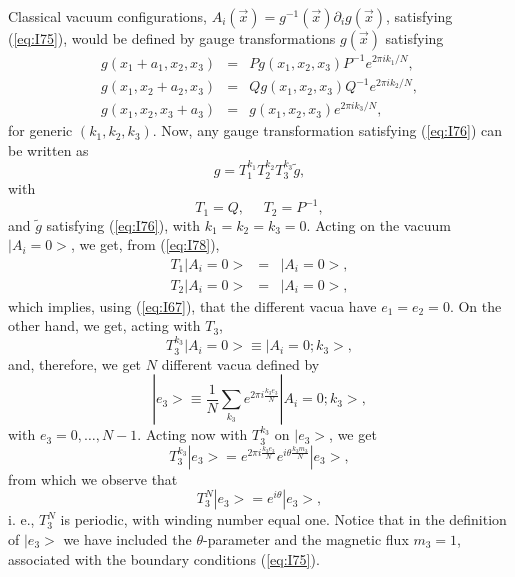 Classical vacuum configurations, $A_i(\vec{x}) = g^{-1}(\vec{x})
\partial_i g(\vec{x})$, satisfying (\ref{eq:I75}), would be
defined by gauge transformations $g(\vec{x})$ satisfying
\begin{eqnarray}
g(x_1+a_1,x_2,x_3) & = & P g(x_1,x_2,x_3) P^{-1} e^{2 \pi i k_1/N}, \nonumber \\
g(x_1,x_2+a_2,x_3) & = & Q g(x_1,x_2,x_3) Q^{-1} e^{2 \pi i k_2/N}, \nonumber \\
g(x_1,x_2,x_3+a_3) & = & g(x_1,x_2,x_3) e^{2 \pi i k_3/N},
\label{eq:I76}
\end{eqnarray}
for generic $(k_1,k_2,k_3)$. Now, any gauge transformation
satisfying (\ref{eq:I76}) can be written as
\begin{equation}
g=T_1^{k_1} T_2^{k_2} T_3^{k_3} \tilde{g},
\label{eq:I77}
\end{equation}
with
\begin{equation}
T_1 = Q, \: \: \: \: \: \: T_2 = P^{-1},
\label{eq:I78}
\end{equation}
and $\tilde{g}$ satisfying (\ref{eq:I76}), with $k_1=k_2=k_3=0$.
Acting on the vacuum $|A_i=0>$, we get, from (\ref{eq:I78}),
\begin{eqnarray}
T_1 |A_i =0> & = & |A_i=0>, \nonumber \\
T_2 |A_i =0> & = & |A_i=0>, 
\label{eq:I79}
\end{eqnarray}
which implies, using (\ref{eq:I67}), that the different vacua
have $e_1=e_2=0$. On the other hand, we get, acting with $T_3$, 
\begin{equation}
T_3^{k_3} |A_i=0> \equiv |A_i=0; k_3>,
\label{eq:I80}
\end{equation}
and, therefore, we get $N$ different vacua defined by 
\begin{equation}
|e_3> \equiv \frac {1}{N} \sum_{k_3} e^{2 \pi i \frac {k_3
e_3}{N}} |A_i=0 ; k_3>,
\label{eq:I81}
\end{equation}
with $e_3=0, \ldots, N-1$. Acting now with $T_3^{k_3}$ on
$|e_3>$, we get
\begin{equation}
T_3^{k_3} |e_3> = e^{2 \pi i \frac {k_3 e_3}{N}} e^{i \theta
\frac {k_3 m_3}{N}} |e_3>,
\label{eq:I82}
\end{equation}
from which we observe that 
\begin{equation}
T_3^{N} |e_3> = e^{i \theta} |e_3>,
\label{eq:I83}
\end{equation}
i. e., $T_3^{N}$ is periodic, with winding number equal one.
Notice that in the definition of $|e_3>$ we have included the
$\theta$-parameter and the magnetic flux $m_3=1$, associated with
the boundary conditions (\ref{eq:I75}).
  
